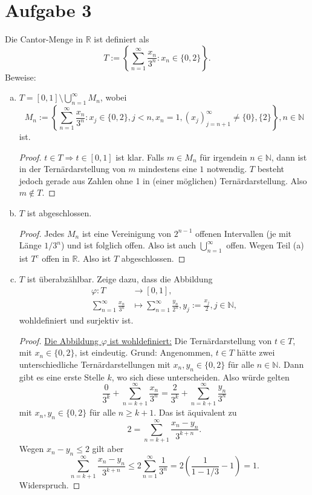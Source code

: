 \documentclass[10pt]{article}\usepackage[]{graphicx}\usepackage[]{color}
\newcommand{\N}{\mathbb{N}}
\newcommand{\R}{\mathbb{R}}
\begin{document}
\section*{Aufgabe 3}
Die Cantor-Menge in $\R$ ist definiert als
\[
  T := \left\{\sum_{n=1}^{\infty} \frac{x_n}{3^n} : x_n \in \{0, 2\}\right\}.
\]
Beweise:
\begin{enumerate}[(a)]
  \item $T = [0,1] \setminus \bigcup_{n=1}^{\infty} M_n$, wobei
  \[
    M_n := \left\{\sum_{n=1}^{\infty} \frac{x_n}{3^n} : x_j \in \{0, 2\}, j < n, x_n = 1, (x_j)_{j=n+1}^{\infty} \neq \{0\}, \{2\}\right\}, n \in \N
  \]
  ist.
  \begin{proof}
   $t \in T \Rightarrow t \in [0,1]$ ist klar.
   Falls $m \in M_n$ für irgendein $n \in \N$, dann ist in der Ternärdarstellung von $m$
   mindestens eine $1$ notwendig. $T$ besteht jedoch gerade aus Zahlen ohne 1 in (einer möglichen)
   Ternärdarstellung. Also $m \notin T$.
  \end{proof}

  \item $T$ ist abgeschlossen.
  \begin{proof}
  Jedes $M_n$ ist eine Vereinigung von $2^{n-1}$ offenen Intervallen
  (je mit Länge $1/3^n$) und ist folglich offen.
  Also ist auch $\bigcup_{n = 1}^{\infty}$ offen.
  Wegen Teil (a) ist $T^c$ offen in $\R$. Also ist $T$ abgeschlossen.
  \end{proof}

  \item $T$ ist überabzählbar. Zeige dazu, dass die Abbildung
  \begin{align*}
    \varphi : T &\to [0,1],\\
    \sum_{n=1}^{\infty} \frac{x_n}{3^n}  &\mapsto \sum_{n=1}^{\infty} \frac{y_n}{2^n}, y_j := \frac{x_j}{2}, j \in \N,
  \end{align*}
  wohldefiniert und surjektiv ist.
  \begin{proof}
  \uline{Die Abbildung $\varphi$ ist wohldefiniert:}
  Die Ternärdarstellung von $t \in T$, mit $x_n \in \{0, 2\}$, ist eindeutig.
  Grund: Angenommen, $t \in T$ hätte zwei unterschiedliche Ternärdarstellungen
  mit $x_n,y_n \in \{0,2\}$ für alle $n \in \N$. Dann gibt es eine erste Stelle $k$,
  wo sich diese unterscheiden.
  Also würde gelten
  \[
  \frac{0}{3^k} + \sum_{n = k+1}^{\infty} \frac{x_n}{3^n} = \frac{2}{3^k} + \sum_{n = k+1}^{\infty} \frac{y_n}{3^n}
  \]
  mit $x_n, y_n \in \{0,2\}$ für alle $n \geq k+1$.
  Das ist äquivalent zu
  \[
    2 = \sum_{n = k+1}^{\infty} \frac{x_n-y_n}{3^{k+n}}.
  \]
  Wegen $x_n-y_n \leq 2$ gilt aber
  \[
  \sum_{n = k+1}^{\infty} \frac{x_n-y_n}{3^{k+n}} \leq 2 \sum_{n = 1}^{\infty} \frac{1}{3^n} = 2\left(\frac{1}{1-1/3}-1\right) = 1.
  \]
  Widerspruch.


\end{proof}
\end{enumerate}
\end{document}
